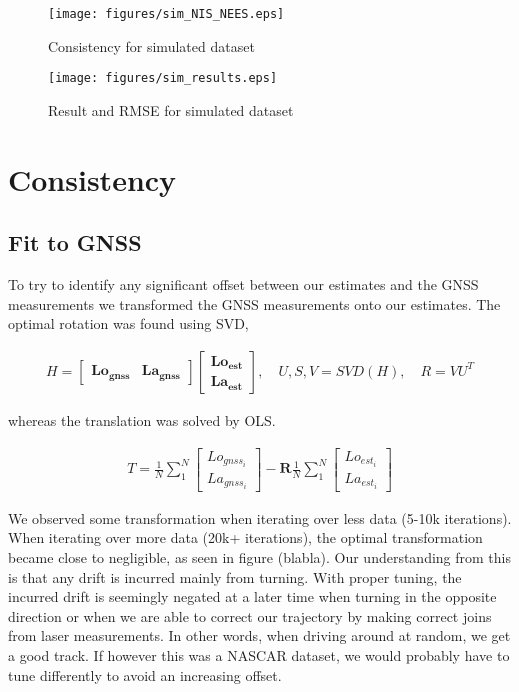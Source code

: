 \begin{figure}
    \centering
    \texttt{[image: figures/sim\_NIS\_NEES.eps]}
    \caption{Consistency for simulated dataset}
	\label{fig:1_1}
\end{figure}
\begin{figure}
    \centering
    \texttt{[image: figures/sim\_results.eps]}
    \caption{Result and RMSE for simulated dataset}
	\label{fig:1_2}
\end{figure}


\section{Consistency}

\subsection{Fit to GNSS}


To try to identify any significant offset between our estimates
and the GNSS measurements we transformed the GNSS measurements onto our estimates.
The optimal rotation was found using SVD,

\begin{align*}
    H = 
    \begin{bmatrix}
        \mathbf{Lo_{gnss}} & \mathbf{La_{gnss}}
    \end{bmatrix}
    \begin{bmatrix}
        \mathbf{Lo_{est}} \\ \mathbf{La_{est}}
    \end{bmatrix}
    , \quad
    U, S, V = SVD(H)
    , \quad
    R = VU^T
\end{align*}

whereas the translation was 
solved by OLS.

\begin{align*}
    T = \frac{1}{N} \sum_{1}^{N} 
    \begin{bmatrix}
        Lo_{gnss_i} \\ La_{gnss_i}
    \end{bmatrix}
    - \mathbf{R}
    \frac{1}{N} \sum_{1}^{N} 
    \begin{bmatrix}
        Lo_{est_i} \\ La_{est_i}
    \end{bmatrix}
\end{align*}

We observed some transformation when iterating over less data
(5-10k iterations). When iterating over more data (20k+ iterations),
the optimal transformation became close to negligible, as seen in figure (blabla).
Our understanding from this is that any drift is incurred mainly
from turning. With proper tuning, the incurred drift is seemingly negated
at a later time when turning in the opposite direction or when we are able
to correct our trajectory by making correct joins from laser measurements.
In other words,
when driving around at random, we get a good track. If however this 
was a NASCAR dataset, we would probably have to tune differently to 
avoid an increasing offset.

